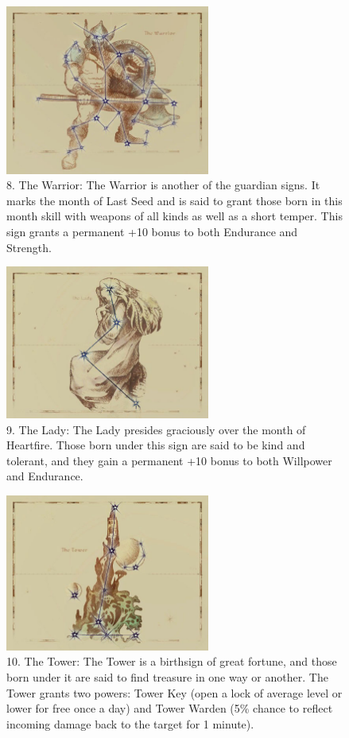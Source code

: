 \documentclass[12pt]{book}
\begin{document}
\begin{figure}[H]
\includegraphics[width=0.6\textwidth]{Warrior.png}
\centering
\caption*{8. The Warrior: The Warrior is another of the guardian signs. It marks the month of Last Seed and is said to grant those born in this month skill with weapons of all kinds as well as a short temper. This sign grants a permanent +10 bonus to both Endurance and Strength.}
\end{figure}

\begin{figure}[H]
\includegraphics[width=0.6\textwidth]{Lady.png}
\centering
\caption*{9. The Lady: The Lady presides graciously over the month of Heartfire. Those born under this sign are said to be kind and tolerant, and they gain a permanent +10 bonus to both Willpower and Endurance.}
\end{figure}

\begin{figure}[H]
\includegraphics[width=0.6\textwidth]{Tower.png}
\centering
\caption*{10. The Tower: The Tower is a birthsign of great fortune, and those born under it are said to find treasure in one way or another. The Tower grants two powers: Tower Key (open a lock of average level or lower for free once a day) and Tower Warden (5\% chance to reflect incoming damage back to the target for 1 minute).}
\end{figure}
\end{document}
